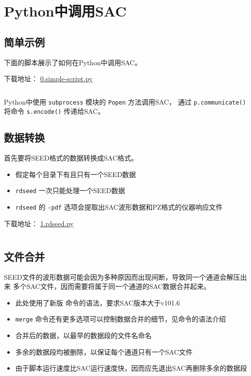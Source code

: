 \section{Python中调用SAC}
\label{sec:sac-python}

\subsection{简单示例}
下面的脚本展示了如何在Python中调用SAC。

下载地址： \href{https://raw.githubusercontent.com/seisman/SAC_Docs_zh/master/call-in-script/0.simple-script.py}{0.simple-script.py}
\inputminted{python}{./call-in-script/0.simple-script.py}
Python中使用 \texttt{subprocess} 模块的 \texttt{Popen} 方法调用SAC，
通过 \texttt{p.communicate()} 将命令 \texttt{s.encode()} 传递给SAC。

\subsection{数据转换}
首先要将SEED格式的数据转换成SAC格式。
\begin{itemize}
\item 假定每个目录下有且只有一个SEED数据
\item \texttt{rdseed} 一次只能处理一个SEED数据
\item \texttt{rdseed} 的 \texttt{-pdf} 选项会提取出SAC波形数据和PZ格式的仪器响应文件
\end{itemize}

下载地址： \href{https://raw.githubusercontent.com/seisman/SAC_Docs_zh/master/call-in-script/1.rdseed.py}{1.rdseed.py}
\inputminted{python}{./call-in-script/1.rdseed.py}

\subsection{文件合并}
\label{subsec:merge-in-python}
SEED文件的波形数据可能会因为多种原因而出现间断，导致同一个通道会解压出来
多个SAC文件，因而需要将属于同一个通道的SAC数据合并起来。
\begin{itemize}
\item 此处使用了新版  命令的语法，要求SAC版本大于v101.6
\item \texttt{merge} 命令还有更多选项可以控制数据合并的细节，见命令的语法介绍
\item 合并后的数据，以最早的数据段的文件名命名
\item 多余的数据段均被删除，以保证每个通道只有一个SAC文件
\item 由于脚本运行速度比SAC运行速度快，因而应先退出SAC再删除多余的数据段
\end{itemize}

